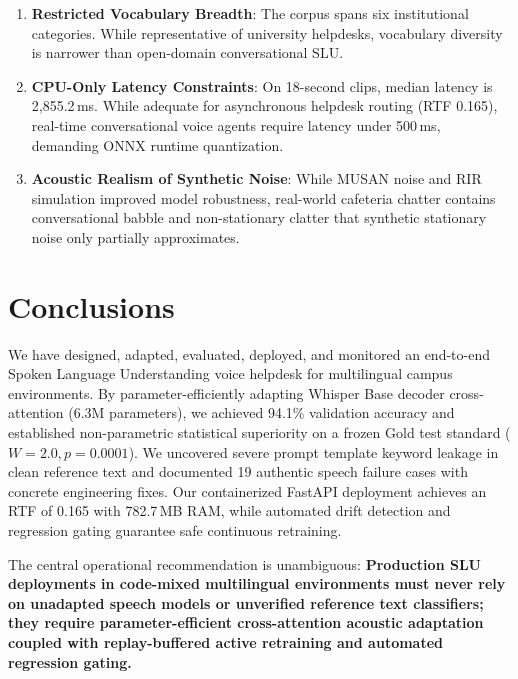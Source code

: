 \documentclass[sigconf,authordraft]{acmart}
\begin{document}
\begin{enumerate}
  \item \textbf{Restricted Vocabulary Breadth}: The corpus spans six institutional categories.
    While representative of university helpdesks, vocabulary diversity is narrower than open-domain conversational SLU.
  \item \textbf{CPU-Only Latency Constraints}: On 18-second clips, median latency is 2,855.2\,ms.
    While adequate for asynchronous helpdesk routing (RTF 0.165), real-time conversational voice agents
    require latency under 500\,ms, demanding ONNX runtime quantization.
  \item \textbf{Acoustic Realism of Synthetic Noise}: While MUSAN noise and RIR simulation improved
    model robustness, real-world cafeteria chatter contains conversational babble and non-stationary
    clatter that synthetic stationary noise only partially approximates.
\end{enumerate}

\section{Conclusions}
\label{sec:conclusion}

We have designed, adapted, evaluated, deployed, and monitored an end-to-end Spoken Language
Understanding voice helpdesk for multilingual campus environments. By parameter-efficiently adapting
Whisper Base decoder cross-attention (6.3M parameters), we achieved 94.1\% validation accuracy and
established non-parametric statistical superiority on a frozen Gold test standard ($W = 2.0, p = 0.0001$).
We uncovered severe prompt template keyword leakage in clean reference text and documented 19 authentic
speech failure cases with concrete engineering fixes. Our containerized FastAPI deployment achieves
an RTF of 0.165 with 782.7\,MB RAM, while automated drift detection and regression gating guarantee
safe continuous retraining.

The central operational recommendation is unambiguous: \textbf{Production SLU deployments in code-mixed
multilingual environments must never rely on unadapted speech models or unverified reference text classifiers;
they require parameter-efficient cross-attention acoustic adaptation coupled with replay-buffered
active retraining and automated regression gating.}
\end{document}
